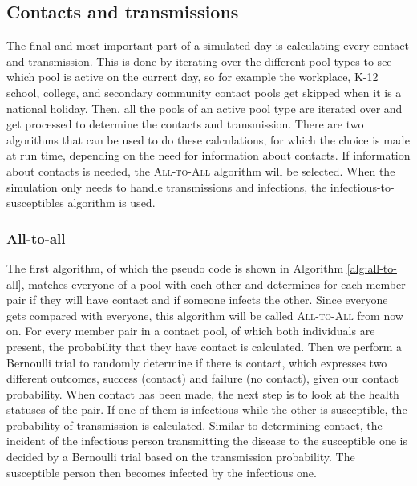 \subsection{Contacts and transmissions}
\label{subsec:contacts_and_transmissions}
The final and most important part of a simulated day is calculating every contact and transmission. This is done by iterating over the different pool types to see which pool is active on the current day, so for example the workplace, K-12 school, college, and secondary community contact pools get skipped when it is a national holiday. Then, all the pools of an active pool type are iterated over and get processed to determine the contacts and transmission. There are two algorithms that can be used to do these calculations, for which the choice is made at run time, depending on the need for information about contacts. If information about contacts is needed, the \textsc{All-to-All} algorithm will be selected. When the simulation only needs to handle transmissions and infections, the infectious-to-susceptibles algorithm is used.

\subsubsection{All-to-all}
The first algorithm, of which the pseudo code is shown in Algorithm \ref{alg:all-to-all}, matches everyone of a pool with each other and determines for each member pair if they will have contact and if someone infects the other. Since everyone gets compared with everyone, this algorithm will be called \textsc{All-to-All} from now on. For every member pair in a contact pool, of which both individuals are present, the probability that they have contact is calculated. Then we perform a Bernoulli trial to randomly determine if there is contact, which expresses two different outcomes, success (contact) and failure (no contact), given our contact probability. When contact has been made, the next step is to look at the health statuses of the pair. If one of them is infectious while the other is susceptible, the probability of transmission is calculated. Similar to determining contact, the incident of the infectious person transmitting the disease to the susceptible one is decided by a Bernoulli trial based on the transmission probability. The susceptible person then becomes infected by the infectious one.

